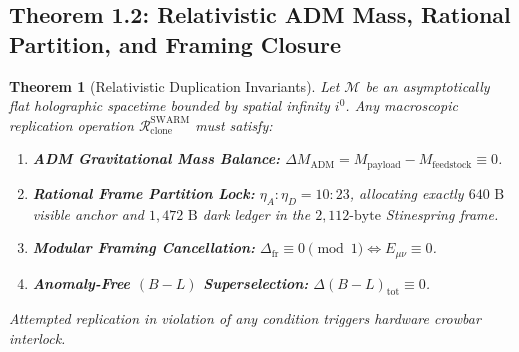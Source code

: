 \documentclass[11pt,onecolumn]{article}
\newtheorem{theorem}{Theorem}
\begin{document}
\FloatBarrier
\subsection{Theorem 1.2: Relativistic ADM Mass, Rational Partition, and Framing Closure}
\begin{theorem}[Relativistic Duplication Invariants]
Let $\mathcal{M}$ be an asymptotically flat holographic spacetime bounded by spatial infinity $i^0$. Any macroscopic replication operation $\mathcal{R}_{\text{clone}}^{\text{SWARM}}$ must satisfy:
\begin{enumerate}
    \item \textbf{ADM Gravitational Mass Balance:} $\Delta M_{\text{ADM}} = M_{\text{payload}} - M_{\text{feedstock}} \equiv 0$.
    \item \textbf{Rational Frame Partition Lock:} $\eta_A : \eta_D = 10 : 23$, allocating exactly $640\text{ B}$ visible anchor and $1{,}472\text{ B}$ dark ledger in the $2{,}112\text{-byte}$ Stinespring frame.
    \item \textbf{Modular Framing Cancellation:} $\Delta_{\text{fr}} \equiv 0 \pmod 1 \iff E_{\mu\nu} \equiv 0$.
    \item \textbf{Anomaly-Free $(B-L)$ Superselection:} $\Delta(B-L)_{\text{tot}} \equiv 0$.
\end{enumerate}
Attempted replication in violation of any condition triggers hardware crowbar interlock.
\end{theorem}
\end{document}
